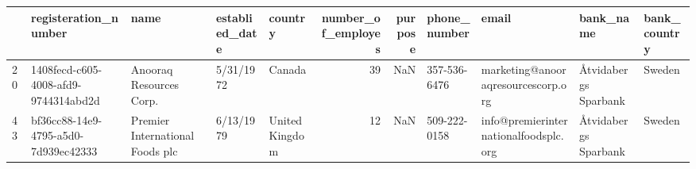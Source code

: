\begin{tabular}{lllllrrllll}
\toprule
{} &                  registeration\_number &                             name & establied\_date &         country &  number\_of\_employes &  purpose &  phone\_number &                                  email &             bank\_name & bank\_country \\
\midrule
20 &  1408fecd-c605-4008-afd9-9744314abd2d &          Anooraq Resources Corp. &      5/31/1972 &          Canada &                  39 &      NaN &  357-536-6476 &     marketing@anooraqresourcescorp.org &  Åtvidabergs Sparbank &       Sweden \\
43 &  bf36cc88-14e9-4795-a5d0-7d939ec42333 &  Premier International Foods plc &      6/13/1979 &  United Kingdom &                  12 &      NaN &  509-222-0158 &  info@premierinternationalfoodsplc.org &  Åtvidabergs Sparbank &       Sweden \\
\bottomrule
\end{tabular}
